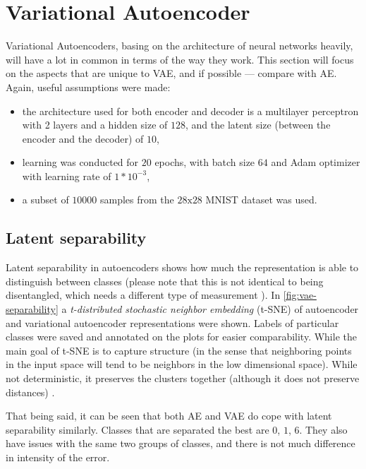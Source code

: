 \section{Variational Autoencoder}
Variational Autoencoders, basing on the architecture of neural networks heavily, will have a lot in common in terms of the way they work. This section will focus on the aspects that are unique to VAE, and if possible — compare with AE. Again, useful assumptions were made:
\begin{itemize}
    \item the architecture used for both encoder and decoder is a multilayer perceptron with 2 layers and a hidden size of $128$, and the latent size (between the encoder and the decoder) of $10$,
    \item learning was conducted for $20$ epochs, with batch size $64$ and Adam optimizer with learning rate of $1*10^{-3}$, 
    \item a subset of $10000$ samples from the $28\textrm{x}28$ MNIST dataset was used.
\end{itemize}

\subsection{Latent separability}
Latent separability in autoencoders shows how much the representation is able to distinguish between classes (please note that this is not identical to being disentangled, which needs a different type of measurement \cite{Higgins2017}). In \autoref{fig:vae-separability} a \textit{t-distributed stochastic neighbor embedding} (t-SNE) of autoencoder and variational autoencoder representations were shown. Labels of particular classes were saved and annotated on the plots for easier comparability. While the main goal of t-SNE is to capture structure (in the sense that neighboring points in the input space will tend to be neighbors in the low dimensional space). While not deterministic, it preserves the clusters together (although it does not preserve distances) \cite{Hinton2009}.

\vspace{\baselineskip}
That being said, it can be seen that both AE and VAE do cope with latent separability similarly. Classes that are separated the best are $0$, $1$, $6$. They also have issues with the same two groups of classes, and there is not much difference in intensity of the error.

